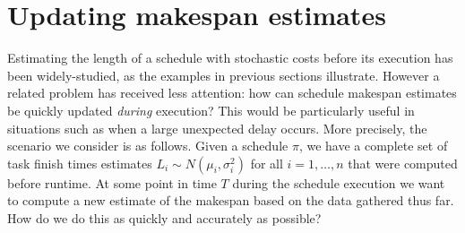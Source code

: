 \documentclass[12pt]{article}
\def\P{\mathbb{P}}
\def\E{\mathbb{E}}
\DeclareMathOperator*{\argmax}{arg\,max}
\newtheorem{prop}[theorem]{Proposition}
\begin{document}
  


\section{Updating makespan estimates}
\label{sect.updating}


Estimating the length of a schedule with stochastic costs before its execution has been widely-studied, as the examples in previous sections illustrate. However a related problem has received less attention: how can schedule makespan estimates be quickly updated {\em during} execution? This would be particularly useful in situations such as when a large unexpected delay occurs. More precisely, the scenario we consider is as follows. Given a schedule $\pi$, we have a complete set of task finish times estimates $L_i \sim N(\mu_i, \sigma_i^2)$ for all $i = 1, \dots, n$ that were computed before runtime. At some point in time $T$ during the schedule execution we want to compute a new estimate of the makespan based on the data gathered thus far. How do we do this as quickly and accurately as possible?
\end{document}
